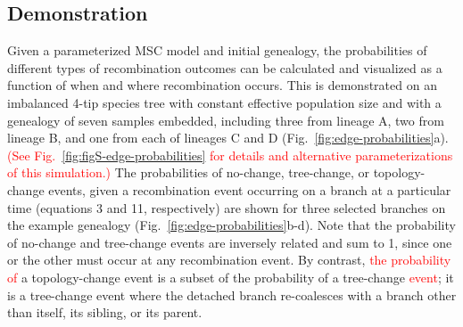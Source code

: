 \documentclass[11pt]{article}
\begin{document}
\subsection{Demonstration}
Given a parameterized MSC model and initial genealogy, the probabilities of 
different types of recombination outcomes can be calculated and visualized as 
a function of when and where recombination occurs. This is demonstrated on an 
imbalanced 4-tip species tree with constant effective population size 
and with a genealogy of seven samples embedded, 
including three from lineage A, two from lineage B, and one from each of lineages
C and D (Fig.~\ref{fig:edge-probabilities}a). 
\textcolor{red}{(See Fig.~\ref{fig:figS-edge-probabilities} for details and
alternative parameterizations of this simulation.)}
The probabilities of no-change, tree-change, or topology-change events, 
given a recombination event occurring on a branch at a particular time 
(equations 3 and 11, respectively) are shown for three selected branches
on the example genealogy (Fig.~\ref{fig:edge-probabilities}b-d). 
Note that the probability of no-change and tree-change events 
are inversely related and sum to 1, since one or the other must occur at any 
recombination event. By contrast, \textcolor{red}{the probability of} a 
topology-change event is a subset of the probability of a tree-change 
\textcolor{red}{event}; 
it is a tree-change event where the detached branch re-coalesces with 
a branch other than itself, its sibling, or its parent.

\end{document}

